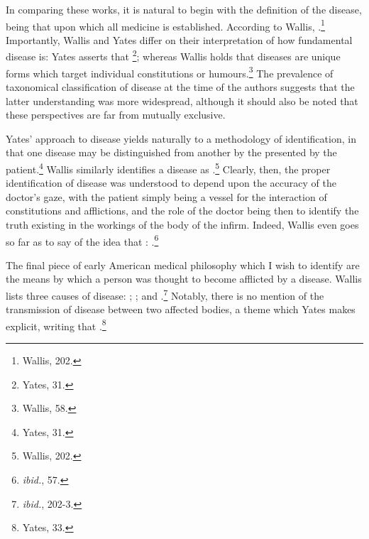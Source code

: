 \documentclass[12pt]{article}
\begin{document}
In comparing these works, it is natural to begin with the definition of the disease, being that upon which all medicine is established. According to Wallis,
.\footnote{Wallis, 202.} Importantly, Wallis and Yates differ on their interpretation of how fundamental disease is:
Yates asserts that \footnote{Yates, 31.}; whereas Wallis holds that diseases are unique forms
which target individual constitutions or humours.\footnote{Wallis, 58.} The prevalence of taxonomical classification of disease
at the time of the authors suggests that the latter understanding was more widespread, although it should also be noted that these
perspectives are far from mutually exclusive.

Yates' approach to disease yields naturally to a methodology of identification, in that one disease may be distinguished from another
by the  presented by the patient.\footnote{Yates, 31.} Wallis similarly
identifies a disease as .\footnote{Wallis, 202.}
Clearly, then, the proper identification of disease was understood to depend upon the accuracy of the doctor's
gaze, with the patient simply being a vessel for the interaction of constitutions and afflictions, and the role of the doctor being then
to identify the truth existing in the workings of the body of the infirm. Indeed, Wallis even goes so far as to say of the idea that
: .\footnote{\textit{ibid.}, 57.}

The final piece of early American medical philosophy which I wish to identify are the means by which a person was thought to
become afflicted by a disease. Wallis lists three causes of disease: ; ; and
.\footnote{\textit{ibid.}, 202-3.}
Notably, there is no mention of the transmission of disease between two affected bodies, a theme which Yates makes explicit, writing that
.\footnote{Yates, 33.}
\end{document}

